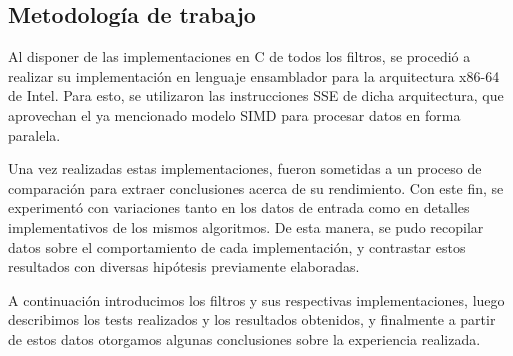 \subsection{Metodología de trabajo}
Al disponer de las implementaciones en C de todos los filtros, se procedió a realizar su implementación en lenguaje ensamblador para la arquitectura x86-64 de Intel. Para esto, se utilizaron las instrucciones SSE de dicha arquitectura, que aprovechan el ya mencionado modelo SIMD para procesar datos en forma paralela.

Una vez realizadas estas implementaciones, fueron sometidas a un proceso de comparación para extraer conclusiones acerca de su rendimiento. Con este fin, se experimentó con variaciones tanto en los datos de entrada como en detalles implementativos de los mismos algoritmos. De esta manera, se pudo recopilar datos sobre el comportamiento de cada implementación, y contrastar estos resultados con diversas hipótesis previamente elaboradas.

A continuación introducimos los filtros y sus respectivas implementaciones, luego describimos los tests realizados y los resultados obtenidos, y finalmente a partir de estos datos otorgamos algunas conclusiones sobre la experiencia realizada.